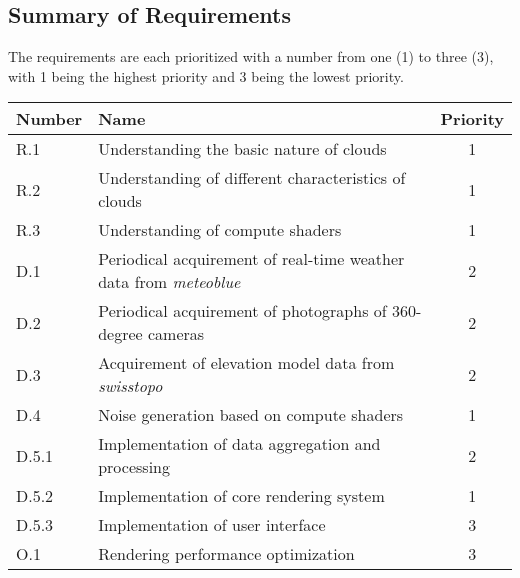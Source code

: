 \subsection{Summary of Requirements}
\label{section:requirements:summary}
The requirements are each prioritized with a number from one (1) to three (3), with 1 being the highest priority and 3 being the lowest priority.
\emptyline
\noindent\begin{tabularx}{\textwidth}{|l|X|c|}
    \hline
    \textbf{Number} & \textbf{Name}                                                         & \textbf{Priority} \\ \hline
    R.1             & Understanding the basic nature of clouds                              & 1                 \\ \hline
    R.2             & Understanding of different characteristics of clouds                  & 1                 \\ \hline
    R.3             & Understanding of compute shaders                                      & 1                 \\ \hline
    D.1             & Periodical acquirement of real-time weather data from \emph{meteoblue}& 2                 \\ \hline
    D.2             & Periodical acquirement of photographs of 360-degree cameras           & 2                 \\ \hline
    D.3             & Acquirement of elevation model data from \emph{swisstopo}             & 2                 \\ \hline
    D.4             & Noise generation based on compute shaders                             & 1                 \\ \hline
    D.5.1           & Implementation of data aggregation and processing                     & 2                 \\ \hline
    D.5.2           & Implementation of core rendering system                               & 1                 \\ \hline
    D.5.3           & Implementation of user interface                                      & 3                 \\ \hline
    O.1             & Rendering performance optimization                                    & 3                 \\ \hline
\end{tabularx}